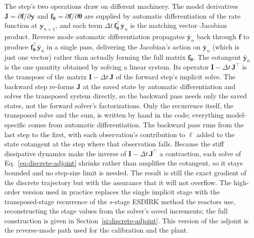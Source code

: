 \documentclass{article}
\begin{document}
The step's two operations draw on different machinery. The model derivatives \(\mathbf{J}=\partial\mathbf{f}/\partial\mathbf{y}\) and \(\mathbf{f}_{\boldsymbol{\theta}}=\partial\mathbf{f}/\partial\boldsymbol{\theta}\) are supplied by automatic differentiation of the rate function at \(\mathbf{y}_{n+1}\), and each term \(\Delta t\,\mathbf{f}_{\boldsymbol{\theta}}^{\top}\bar{\mathbf{y}}_n\) is the matching vector--Jacobian product. Reverse mode automatic differentiation propagates \(\bar{\mathbf{y}}_n\) back through \(\mathbf{f}\) to produce \(\mathbf{f}_{\boldsymbol{\theta}}^{\top}\bar{\mathbf{y}}_n\) in a single pass, delivering the Jacobian's action on \(\bar{\mathbf{y}}_n\) (which is just one vector) rather than actually forming the full matrix \(\mathbf{f}_{\boldsymbol{\theta}}\). The cotangent \(\bar{\mathbf{y}}_n\) is the one quantity obtained by solving a linear system.  Its operator \(\mathbf{I}-\Delta t\,\mathbf{J}^{\top}\) is the transpose of the matrix \(\mathbf{I}-\Delta t\,\mathbf{J}\) of the forward step's implicit solve. The backward step re-forms \(\mathbf{J}\) at the saved state by automatic differentiation and solves the transposed system directly, so the backward pass needs only the saved states, not the forward solver's factorizations. Only the recurrence itself, the transposed solve and the sum, is written by hand in the code; everything model-specific comes from automatic differentiation. The backward pass runs from the last step to the first, with each observation's contribution to \(\ell\) added to the state cotangent at the step where that observation falls. Because the stiff dissipative dynamics make the inverse of \(\mathbf{I}-\Delta t\,\mathbf{J}^{\top}\) a contraction, each solve of Eq.~\eqref{eq:discrete-adjoint} shrinks rather than amplifies the cotangent, so it stays bounded and no step-size limit is needed. The result is still the exact gradient of the discrete trajectory but with the assurance that it will not overflow. The high-order version used in practice replaces the single implicit stage with the transposed-stage recurrence of the \(s\)-stage ESDIRK method the reactors use, reconstructing the stage values from the solver's saved increments; the full construction is given in Section~\ref{si:discrete-adjoint}. This version of the adjoint is the reverse-mode path used for the calibration and the plant.
\end{document}
